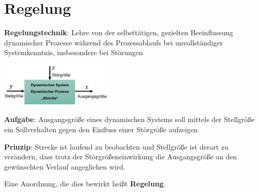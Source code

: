 \section{Regelung}

\textbf{Regelungstechnik}: Lehre von der selbsttätigen, gezielten Beeinflussung dynamischer Prozesse während des Prozessablaufs bei unvollständiger Systemkenntnis, insbesondere bei Störungen
\begin{center}
	\includegraphics[width=0.4\textwidth]{images/regelung.png}
\end{center}

\textbf{Aufgabe}: Ausgangsgröße eines dynamischen Systems soll mittels der Stellgröße ein
Sollverhalten gegen den Einfluss einer Störgröße aufzeigen

\textbf{Prinzip}: Strecke ist laufend zu beobachten und Stellgröße ist derart zu verändern, dass trotz der Störgrößeneinwirkung die Ausgangsgröße an den gewünschten Verlauf angeglichen wird.

Eine Anordnung, die dies bewirkt heißt \textbf{Regelung}.\\

